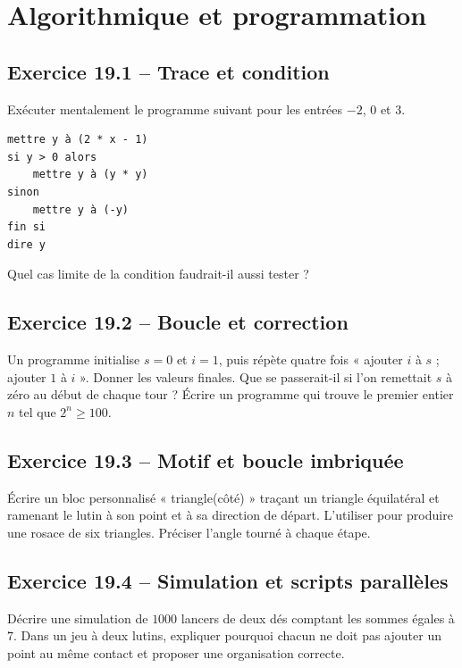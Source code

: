 \chapter{Algorithmique et programmation}
\label{exercices:19}
\section*{Exercice 19.1 -- Trace et condition}
Exécuter mentalement le programme suivant pour les entrées $-2$, $0$ et $3$.
\begin{lstlisting}
mettre y à (2 * x - 1)
si y > 0 alors
    mettre y à (y * y)
sinon
    mettre y à (-y)
fin si
dire y
\end{lstlisting}
Quel cas limite de la condition faudrait-il aussi tester ?

\section*{Exercice 19.2 -- Boucle et correction}
Un programme initialise $s=0$ et $i=1$, puis répète quatre fois « ajouter $i$ à $s$ ; ajouter $1$ à $i$ ». Donner les valeurs finales. Que se passerait-il si l'on remettait $s$ à zéro au début de chaque tour ? Écrire un programme qui trouve le premier entier $n$ tel que $2^n\geq100$.

\section*{Exercice 19.3 -- Motif et boucle imbriquée}
Écrire un bloc personnalisé « triangle(côté) » traçant un triangle équilatéral et ramenant le lutin à son point et à sa direction de départ. L'utiliser pour produire une rosace de six triangles. Préciser l'angle tourné à chaque étape.

\section*{Exercice 19.4 -- Simulation et scripts parallèles}
Décrire une simulation de $1000$ lancers de deux dés comptant les sommes égales à $7$. Dans un jeu à deux lutins, expliquer pourquoi chacun ne doit pas ajouter un point au même contact et proposer une organisation correcte.
